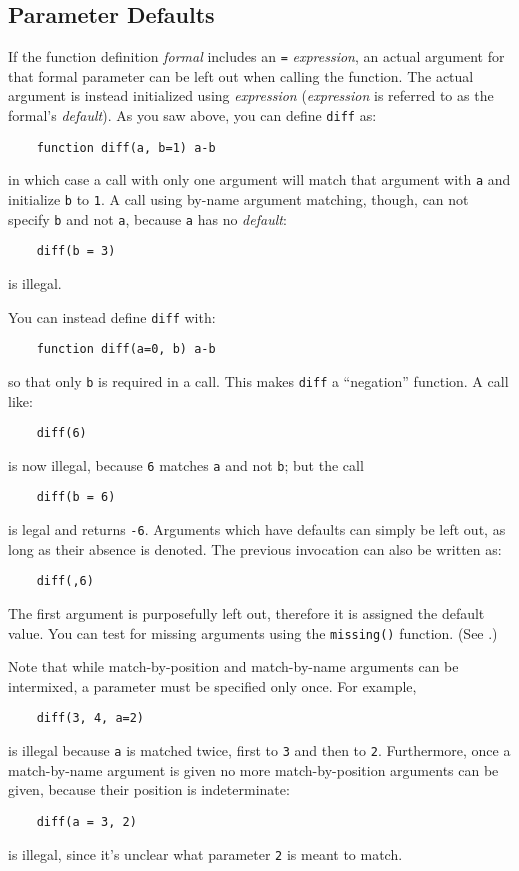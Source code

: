 \subsection{Parameter Defaults}

If the function definition {\em formal} includes an 
{\tt =} {\em expression},
an actual argument for that formal parameter can
be left out when calling the function.  The actual argument is instead
initialized using {\em expression}
({\em expression} is referred to as the formal's {\em default}).
As you saw above, you can define {\tt diff} as:
\begin{verbatim}
    function diff(a, b=1) a-b
\end{verbatim}
in which case a call with only one argument will match that argument
with {\tt a} and initialize {\tt b} to {\tt 1}.  A call using by-name
argument matching, though, can not specify {\tt b} and not {\tt a},
because {\tt a} has no {\em default}:
\begin{verbatim}
    diff(b = 3)
\end{verbatim}
is illegal.

You can instead  define {\tt diff} with:
\begin{verbatim}
    function diff(a=0, b) a-b
\end{verbatim}
so that only {\tt b} is required in a call. This makes {\tt diff}
a ``negation'' function.  A call like:
\begin{verbatim}
    diff(6)
\end{verbatim}
is now illegal, because {\tt 6} matches {\tt a} and not {\tt b}; but
the call
\begin{verbatim}
    diff(b = 6)
\end{verbatim}
is legal and returns {\tt -6}. Arguments 
\label{purposefully-omitted-arguments}
which have defaults can 
simply be left out, as long as their absence is denoted. The previous
invocation can also be written as:
\begin{verbatim}
    diff(,6)
\end{verbatim}
The first argument is purposefully left out, therefore  it is  assigned
the default value.   You can test for missing arguments using the
{\tt missing()} function. (See .)

Note that while match-by-position
and match-by-name arguments can be intermixed, a parameter must
be specified only once.  For example,
\begin{verbatim}
    diff(3, 4, a=2)
\end{verbatim}
is illegal because {\tt a} is matched twice, first to {\tt 3} and
then to {\tt 2}.  Furthermore, once a match-by-name argument is given
no more match-by-position arguments can be given, because  their
position is indeterminate:
\begin{verbatim}
    diff(a = 3, 2)
\end{verbatim}
is illegal, since it's unclear what parameter {\tt 2} is meant to match.

